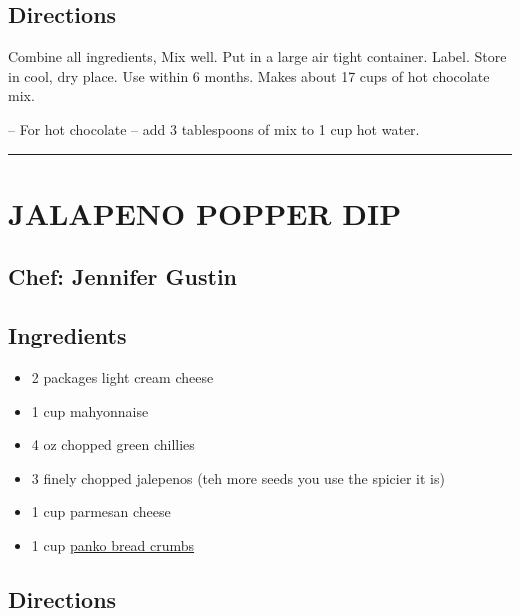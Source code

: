 \documentclass[
]{book}
\providecommand{\tightlist}{%
  \setlength{\itemsep}{0pt}\setlength{\parskip}{0pt}}
\begin{document}
\hypertarget{directions-7}{%
\subsection*{Directions}\label{directions-7}}


Combine all ingredients, Mix well. Put in a large air tight container.
Label. Store in cool, dry place. Use within 6 months. Makes about 17 cups of hot chocolate mix.

-- For hot chocolate -- add 3 tablespoons of mix to 1 cup hot water.

\begin{center}\rule{0.5\linewidth}{0.5pt}\end{center}

\hypertarget{jalapeno-popper-dip}{%
\section*{JALAPENO POPPER DIP}\label{jalapeno-popper-dip}}


\hypertarget{chef-jennifer-gustin-2}{%
\subsection*{Chef: Jennifer Gustin}\label{chef-jennifer-gustin-2}}


\hypertarget{ingredients-8}{%
\subsection*{Ingredients}\label{ingredients-8}}


\begin{itemize}
\tightlist
\item
  2 packages light cream cheese
\item
  1 cup mahyonnaise
\item
  4 oz chopped green chillies
\item
  3 finely chopped jalepenos (teh more seeds you use the spicier it is)
\item
  1 cup parmesan cheese
\item
  1 cup \href{https://en.wikipedia.org/wiki/Bread_crumbs\#Panko}{panko bread crumbs}
\end{itemize}

\hypertarget{directions-8}{%
\subsection*{Directions}\label{directions-8}}
\end{document}
